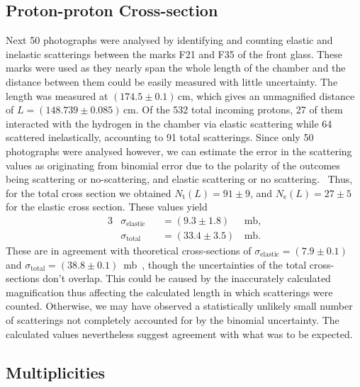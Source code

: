 \documentclass[twocolumn]{article}
\begin{document}
\subsection{Proton-proton Cross-section}
Next 50 photographs were analysed by identifying and counting elastic and inelastic scatterings between the marks F21 and F35 of the front glass. These marks were used as they nearly span the whole length of the chamber and the distance between them could be easily measured with little uncertainty. The length was measured at $(174.5 \pm 0.1)\,$cm, which gives an unmagnified distance of $L=(148.739 \pm 0.085)\,$cm. Of the 532 total incoming protons, 27 of them interacted with the hydrogen in the chamber via elastic scattering while 64 scattered inelastically, accounting to 91 total scatterings. Since only 50 photographs were analysed however, we can estimate the error in the scattering values as originating from binomial error due to the polarity of the outcomes being scattering or no-scattering, and elastic scattering or no scattering.~\cite{leo} Thus, for the total cross section we obtained %
$N_{\text{t}}(L) = 91 \pm 9$, and $N_{\text{e}}(L) = 27 \pm 5$ for the elastic cross section. These values yield
\begin{alignat*}{3}
&\sigma_{\text{elastic}} &&= (9.3 \pm 1.8) \, &\text{mb,}\\
&\sigma_{\text{total}} &&= (33.4 \pm 3.5) \, &\text{mb.} 
\end{alignat*}
These are in agreement with theoretical cross-sections of $\sigma_{\text{elastic}} = (7.9 \pm 0.1)$ and $ \sigma_{\text{total}} = (38.8 \pm 0.1) $~mb~\cite{seul2}, though the uncertainties of the total cross-sections don't overlap. This could be caused by the inaccurately calculated magnification thus affecting the calculated length in which scatterings were counted. Otherwise, we may have observed a statistically unlikely small number of scatterings not completely accounted for by the binomial uncertainty. The calculated values nevertheless suggest agreement with what was to be expected.

\subsection{Multiplicities}
\end{document}
